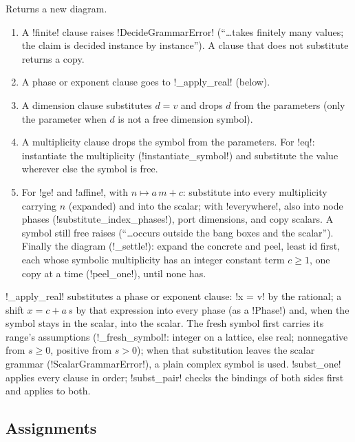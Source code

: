\begin{algorithm}\label{alg:semantics-apply-clause}
Returns a new diagram.
\begin{enumerate}
\item A \code!finite! clause raises \py!DecideGrammarError! (``\ldots takes finitely many values; the claim is decided instance by instance''). A clause that does not substitute returns a copy.
\item A phase or exponent clause goes to \py!_apply_real! (below).
\item A dimension clause substitutes $d=v$ and drops $d$ from the parameters (only the parameter when $d$ is not a free dimension symbol).
\item A multiplicity clause drops the symbol from the parameters. For \code!eq!: instantiate the multiplicity (\py!instantiate_symbol!) and substitute the value wherever else the symbol is free.
\item For \code!ge! and \code!affine!, with $n\mapsto a\,m+c$: substitute into every \bbox{} multiplicity carrying $n$ (expanded) and into the scalar; with \py!everywhere!, also into node phases (\py!substitute_index_phases!), port dimensions, and copy scalars. A symbol still free raises (``\ldots occurs outside the bang boxes and the scalar''). Finally  the diagram (\py!_settle!): expand the concrete \bboxes{} and peel, least \bbox{} id first, each \bbox{} whose symbolic multiplicity has an integer constant term $c\ge1$, one copy at a time (\py!peel_one!), until none has.
\end{enumerate}
\end{algorithm}

\py!_apply_real! substitutes a phase or exponent clause: \code!x = v! by the rational; a shift $x=c+a\,s$ by that expression into every phase (as a \py!Phase!) and, when the symbol stays in the scalar, into the scalar. The fresh symbol first carries its range's assumptions (\py!_fresh_symbol!: integer on a lattice, else real; nonnegative from $s\ge0$, positive from $s>0$); when that substitution leaves the scalar grammar (\py!ScalarGrammarError!), a plain complex symbol is used. \py!subst_one! applies every clause in order; \py!subst_pair! checks the bindings of both sides first and applies to both.

\subsection{Assignments}

